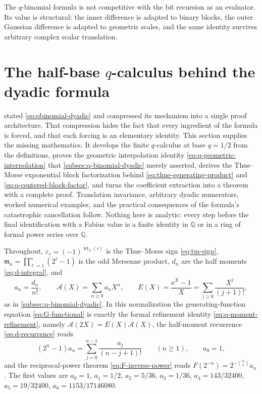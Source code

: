 \documentclass[11pt,oneside]{article}
\theoremstyle{definition}
\theoremstyle{remark}
\newcommand{\Q}{\mathbb Q}
\newcommand{\wt}{\operatorname{wt}_2}
\newcommand{\e}{\mathrm e}
\begin{document}
The $q$-binomial formula is not competitive with the bit recursion as an evaluator.  Its
value is structural: the inner difference is adapted to binary blocks, the outer Gaussian
difference is adapted to geometric scales, and the same identity survives arbitrary complex
scalar translation.

\section{The half-base $q$-calculus behind the dyadic formula}
\label{sec:qs-half-base-calculus}

 stated \eqref{eq:qbinomial-dyadic} and compressed its
mechanism into a single proof architecture.  That compression hides the fact that every
ingredient of the formula is forced, and that each forcing is an elementary identity.  This
section supplies the missing mathematics.  It develops the finite $q$-calculus at base
$q=1/2$ from the definitions, proves the geometric interpolation identity
\eqref{eq:q-geometric-interpolation} that \cref{subsec:q-binomial-dyadic} merely asserted,
derives the Thue--Morse exponential block factorization behind
\eqref{eq:thue-generating-product} and \eqref{eq:q-centered-block-factor}, and turns the
coefficient extraction into a theorem with a complete proof.  Translation invariance,
arbitrary dyadic numerators, worked numerical examples, and the practical consequences of the
formula's catastrophic cancellation follow.  Nothing here is analytic: every step before the
final identification with a Fabius value is a finite identity in $\Q$ or in a ring of formal
power series over $\Q$.

Throughout, $\varepsilon_r=(-1)^{\wt(r)}$ is the Thue--Morse sign \eqref{eq:tm-sign},
$\mathfrak m_n=\prod_{\ell=1}^{n}(2^{\ell}-1)$ is the odd Mersenne product, $d_n$ are the
half moments \eqref{eq:d-integral}, and
\begin{equation}
 a_n=\frac{d_n}{n!},\qquad
 \mathscr A(X)=\sum_{n\ge0}a_nX^n,\qquad
 E(X)=\frac{\e^X-1}{X}=\sum_{j\ge0}\frac{X^j}{(j+1)!},   \label{eq:qs-a-and-series}
\end{equation}
as in \cref{subsec:q-binomial-dyadic}.  In this normalization the generating-function
equation \eqref{eq:G-functional} is exactly the formal refinement identity
\eqref{eq:q-moment-refinement}, namely $\mathscr A(2X)=E(X)\mathscr A(X)$, the
half-moment recurrence \eqref{eq:d-recurrence} reads
\begin{equation}
 (2^n-1)a_n=\sum_{j=0}^{n-1}\frac{a_j}{(n-j+1)!}\qquad(n\ge1),
 \qquad a_0=1,                                            \label{eq:qs-a-recurrence}
\end{equation}
and the reciprocal-power theorem \eqref{eq:F-inverse-power} reads
$F(2^{-n})=2^{-\binom n2}a_n$.  The first values are
$a_0=1$, $a_1=1/2$, $a_2=5/36$, $a_3=1/36$, $a_4=143/32400$, $a_5=19/32400$,
$a_6=1153/17146080$.
\end{document}
